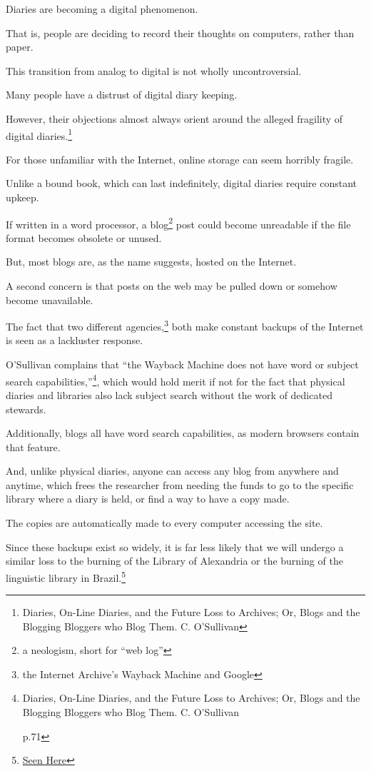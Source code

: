 \documentclass[12pt]{article}[titlepage]
\newcommand{\say}[1]{``#1''}
\newcommand{\1}{\={a}}
\newcommand{\2}{\={e}}
\newcommand{\3}{\={\i}}
\newcommand{\4}{\=o}
\newcommand{\5}{\=u}
\newcommand{\6}{\={A}}
\renewcommand{\,}{\textsuperscript{,}}
\begin{document}
Diaries are becoming a digital phenomenon.

That is, people are deciding to record their thoughts on computers, rather than paper.

This transition from analog to digital is not wholly uncontroversial.


Many people have a distrust of digital diary keeping.

However, their objections almost always orient around the alleged fragility of digital diaries.\footnote{Diaries, On-Line Diaries, and the Future Loss to Archives; Or, Blogs and the Blogging Bloggers who Blog Them. C. O’Sullivan}


For those unfamiliar with the Internet, online storage can seem horribly fragile.

Unlike a bound book, which can last indefinitely, digital diaries require constant upkeep.

If written in a word processor, a blog\footnote{a neologism, short for \say{web log}} post could become unreadable if the file format becomes obsolete or unused.

But, most blogs are, as the name suggests, hosted on the Internet.


A second concern is that posts on the web may be pulled down or somehow become unavailable.

The fact that two different agencies,\footnote{the Internet Archive’s Wayback Machine and Google} both make constant backups of the Internet is seen as a lackluster response.

O’Sullivan complains that \say{the Wayback Machine does not have word or subject search capabilities,}\footnote{Diaries, On-Line Diaries, and the Future Loss to Archives; Or, Blogs and the Blogging Bloggers who Blog Them. C. O’Sullivan

 p.71}, which would hold merit if not for the fact that physical diaries and libraries also lack subject search without the work of dedicated stewards.

Additionally, blogs all have word search capabilities, as modern browsers contain that feature.

And, unlike physical diaries, anyone can access any blog from anywhere and anytime, which frees the researcher from needing the funds to go to the specific library where a diary is held, or find a way to have a copy made.

The copies are automatically made to every computer accessing the site.


Since these backups exist so widely, it is far less likely that we will undergo a similar loss to the burning of the Library of Alexandria or the burning of the linguistic library in Brazil.\footnote{\href{https://www.nationalgeographic.com/science/2018/09/news-museu-nacional-fire-rio-de-janeiro-natural-history/}{Seen Here}}
\end{document}
